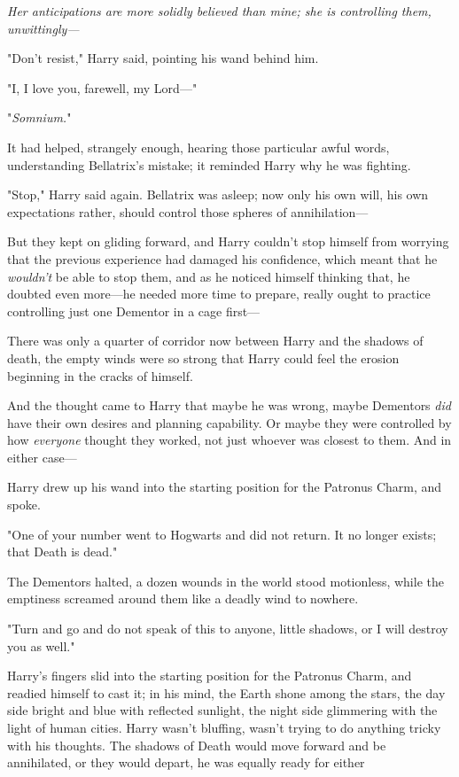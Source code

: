 \emph{Her anticipations are more solidly believed than mine; she is controlling
them, unwittingly---}

"Don't resist," Harry said, pointing his wand behind him.

"I, I love you, farewell, my Lord\mbox{---}"

"\emph{Somnium.}"

It had helped, strangely enough, hearing those particular awful words,
understanding Bellatrix's mistake; it reminded Harry why he was fighting.

"Stop," Harry said again. Bellatrix was asleep; now only his own will, his own
expectations rather, should control those spheres of annihilation---

But they kept on gliding forward, and Harry couldn't stop himself from worrying
that the previous experience had damaged his confidence, which meant that he
\emph{wouldn't} be able to stop them, and as he noticed himself thinking that,
he doubted even more---he needed more time to prepare, really ought to practice
controlling just one Dementor in a cage first---

There was only a quarter of corridor now between Harry and the shadows of
death, the empty winds were so strong that Harry could feel the erosion
beginning in the cracks of himself.

And the thought came to Harry that maybe he was wrong, maybe Dementors
\emph{did} have their own desires and planning capability. Or maybe they were
controlled by how \emph{everyone} thought they worked, not just whoever was
closest to them. And in either case---

Harry drew up his wand into the starting position for the Patronus Charm, and
spoke.

"One of your number went to Hogwarts and did not return. It no longer exists;
that Death is dead."

The Dementors halted, a dozen wounds in the world stood motionless, while the
emptiness screamed around them like a deadly wind to nowhere.

"Turn and go and do not speak of this to anyone, little shadows, or I will
destroy you as well."

Harry's fingers slid into the starting position for the Patronus Charm, and
readied himself to cast it; in his mind, the Earth shone among the stars, the
day side bright and blue with reflected sunlight, the night side glimmering
with the light of human cities. Harry wasn't bluffing, wasn't trying to do
anything tricky with his thoughts. The shadows of Death would move forward and
be annihilated, or they would depart, he was equally ready for either{\el}

